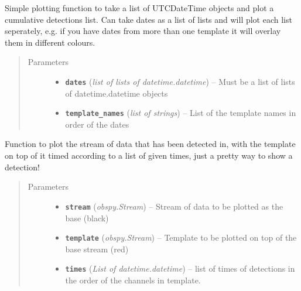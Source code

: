 \documentclass[a4paper,10pt,english]{sphinxmanual}
\begin{document}
\begin{fulllineitems}
\label{modules:EQcorrscan_plotting.cumulative_detections}
Simple plotting function to take a list of UTCDateTime objects and plot
a cumulative detections list.  Can take dates as a list of lists and will
plot each list seperately, e.g. if you have dates from more than one
template it will overlay them in different colours.
\begin{quote}\begin{description}
\item[{Parameters}] \leavevmode\begin{itemize}
\item {} 
\textbf{\texttt{dates}} (\emph{list of lists of datetime.datetime}) -- Must be a list of lists of datetime.datetime objects

\item {} 
\textbf{\texttt{template\_names}} (\emph{list of strings}) -- List of the template names in order of the dates

\end{itemize}

\end{description}\end{quote}

\end{fulllineitems}


\begin{fulllineitems}
\label{modules:EQcorrscan_plotting.detection_multiplot}
Function to plot the stream of data that has been detected in, with the
template on top of it timed according to a list of given times, just a
pretty way to show a detection!
\begin{quote}\begin{description}
\item[{Parameters}] \leavevmode\begin{itemize}
\item {} 
\textbf{\texttt{stream}} (\emph{obspy.Stream}) -- Stream of data to be plotted as the base (black)

\item {} 
\textbf{\texttt{template}} (\emph{obspy.Stream}) -- Template to be plotted on top of the base stream (red)

\item {} 
\textbf{\texttt{times}} (\emph{List of datetime.datetime}) -- list of times of detections in the order of the channels in
template.

\end{itemize}

\end{description}\end{quote}

\end{fulllineitems}
\end{document}
